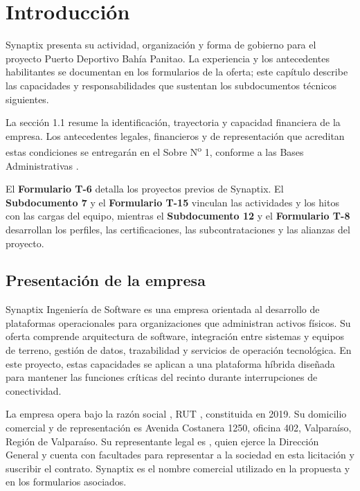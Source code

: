 \chapter{Introducción}

Synaptix presenta su actividad, organización y forma de gobierno para el proyecto Puerto Deportivo Bahía Panitao. La experiencia y los antecedentes habilitantes se documentan en los formularios de la oferta; este capítulo describe las capacidades y responsabilidades que sustentan los subdocumentos técnicos siguientes.

La sección 1.1 resume la identificación, trayectoria y capacidad financiera de la empresa. Los antecedentes legales, financieros y de representación que acreditan estas condiciones se entregarán en el Sobre N\textsuperscript{o} 1, conforme a las Bases Administrativas \parencite[arts.~34.1 y 39, pp.~22 y 25]{bases-admin}.

El \textbf{Formulario T-6} detalla los proyectos previos de Synaptix. El \textbf{Subdocumento 7} y el \textbf{Formulario T-15} vinculan las actividades y los hitos con las cargas del equipo, mientras el \textbf{Subdocumento 12} y el \textbf{Formulario T-8} desarrollan los perfiles, las certificaciones, las subcontrataciones y las alianzas del proyecto.
\newpage
\section{Presentación de la empresa}

Synaptix Ingeniería de Software es una empresa orientada al desarrollo de plataformas operacionales para organizaciones que administran activos físicos. Su oferta comprende arquitectura de software, integración entre sistemas y equipos de terreno, gestión de datos, trazabilidad y servicios de operación tecnológica. En este proyecto, estas capacidades se aplican a una plataforma híbrida diseñada para mantener las funciones críticas del recinto durante interrupciones de conectividad.

La empresa opera bajo la razón social \textbf{\RazonSocial}, RUT \textbf{\RUTEmpresa}, constituida en 2019. Su domicilio comercial y de representación es Avenida Costanera 1250, oficina 402, Valparaíso, Región de Valparaíso. Su representante legal es \textbf{\RepresentanteLegal}, quien ejerce la Dirección General y cuenta con facultades para representar a la sociedad en esta licitación y suscribir el contrato. Synaptix es el nombre comercial utilizado en la propuesta y en los formularios asociados.

